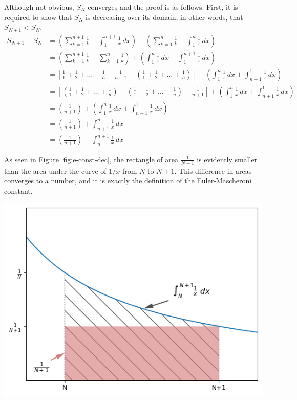 \documentclass[titlepage,12 pt]{article}
\begin{document}
Although not obvious, $S_N$ converges and the proof is as follows. 
First, it is required to show that $S_N$ is decreasing over its domain, in other words, that $S_{N+1} < S_N$.
\small{
\begin{align*}
    S_{N+1} - S_N &= \left(\sum_{k=1}^{n+1} \frac{1}{k} -\int_{1}^{n+1} \frac{1}{x} \,dx\right) - \left(\sum_{k=1}^{n} \frac{1}{k} -\int_{1}^{n} \frac{1}{x} \,dx\right)\\[3 mm]
    &=\left(\sum_{k=1}^{n+1} \frac{1}{k} - \sum_{k=1}^{n} \frac{1}{k}\right) + \left( \int_{1}^{n} \frac{1}{x} \,dx-\int_{1}^{n+1} \frac{1}{x} \,dx\right)\\[3 mm]
    &=\left[ \frac{1}{1} + \frac{1}{2} + \dots + \frac{1}{n} + \frac{1}{n+1} - \left(\frac{1}{1} + \frac{1}{2} + \dots + \frac{1}{n}\right) \right] + \left( \int_{1}^{n} \frac{1}{x} \,dx + \int_{n+1}^{1} \frac{1}{x} \,dx\right)\\[3 mm] 
    &=\left[ \left(\frac{1}{1} + \frac{1}{2} + \dots + \frac{1}{n}\right) - \left(\frac{1}{1} + \frac{1}{2} + \dots + \frac{1}{n}\right) + \frac{1}{n+1} \right] + \left( \int_{1}^{n} \frac{1}{x} \,dx + \int_{n+1}^{1} \frac{1}{x} \,dx\right)\\[3 mm]
    &= \left( \frac{1}{n+1} \right) + \left( \int_{1}^{n} \frac{1}{x} \,dx + \int_{n+1}^{1} \frac{1}{x} \,dx\right)\\[3 mm]
    &= \left( \frac{1}{n+1} \right) + \int_{n+1}^{n} \frac{1}{x} \,dx \\[3 mm]
    &= \left( \frac{1}{n+1} \right) - \int_{n}^{n+1} \frac{1}{x} \,dx 
\end{align*}
}

As seen in Figure \ref{fig:e-const-dec}, the rectangle of area $\frac{1}{N+1}$ is evidently
smaller than the area under the curve of $1/x$ from $N$ to $N+1$.
This difference in areas converges to a number, and it is exactly the definition of the Euler-Mascheroni constant. 
\begin{center}
\includegraphics[scale=0.6]{rendered/euler_constant_decreasing.png}
\label{fig:e-const-dec}
\end{center}
\end{document}
